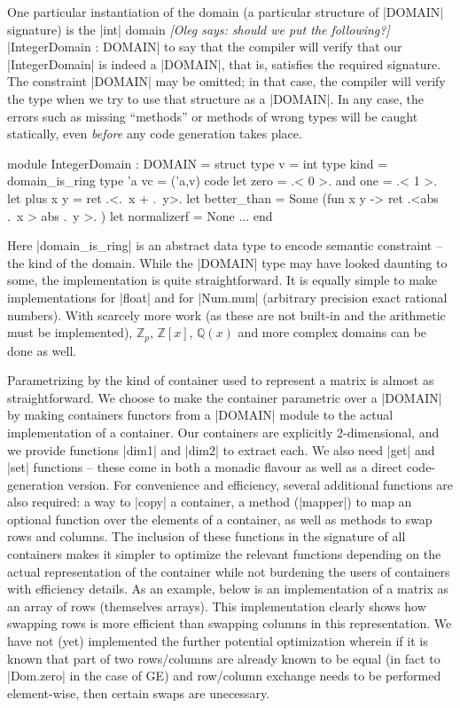 \documentclass{llncs}
\newcommand{\oleg}[1]{{\it [Oleg says: #1]}}
\begin{document}
One particular instantiation of the domain (a particular structure of
|DOMAIN| signature) is the |int| domain \oleg{should we put the following?}
|IntegerDomain : DOMAIN| to say that the compiler will verify that our
|IntegerDomain| is indeed a |DOMAIN|, that is, satisfies the required
signature. The constraint |DOMAIN| may be omitted; in that case, 
the compiler will verify the type when we try to use that structure as
a |DOMAIN|. In any case, the errors such as missing ``methods'' or 
methods of wrong types will be caught statically, even \emph{before} any code
generation takes place.
\begin{small}
\begin{code}
module IntegerDomain : DOMAIN = struct
  type v = int  type kind = domain_is_ring
  type 'a vc = ('a,v) code
  let zero = .< 0 >.  and one = .< 1 >. 
  let plus x y = ret .<.~x + .~y>. 
  let better_than = Some (fun x y -> ret .<abs .~x > abs .~y >. )
  let normalizerf = None
  ...
end
\end{code}
\end{small}
\noindent Here |domain_is_ring| is an abstract data type to encode semantic constraint
-- the kind of the domain.
While the |DOMAIN| type may have looked daunting to some, 
the implementation is quite straightforward.  It is equally simple to 
make implementations for |float| and for |Num.num| (arbitrary precision
exact rational numbers).  With scarcely more work (as these are not 
built-in and the arithmetic must be implemented), $\mathbb{Z}_p$,
$\mathbb{Z}\left[x\right]$, $\mathbb{Q}\left(x\right)$ and more
complex domains can be done as well.

Parametrizing by the kind of container used to represent a matrix is
almost as straightforward.  We choose to make the container parametric
over a |DOMAIN| by making containers functors from a |DOMAIN| module
to the actual implementation of a container.  Our containers are
explicitly 2-dimensional, and we provide functions |dim1| and |dim2|
to extract each.  We also need |get| and |set| functions -- these come
in both a monadic flavour as well as a direct code-generation version.
For convenience and efficiency, several additional functions are also
required: a way to |copy| a container, a method (|mapper|) to map an
optional function over the elements of a container, as well as methods
to swap rows and columns.  The inclusion of these functions in the 
signature of all containers makes it simpler to optimize the relevant
functions depending on the actual representation of the container
while not burdening the users of containers with efficiency details.
As an example, below is an implementation of a matrix as an
array of rows (themselves arrays).  This implementation clearly shows
how swapping rows is more efficient than swapping columns in this
representation.  We have not (yet) implemented the further potential
optimization wherein if it is known that part of two rows/columns are already
known to be equal (in fact to |Dom.zero| in the case of GE) and
row/column exchange needs to be performed element-wise, then certain
swaps are unecessary.
\end{document}
